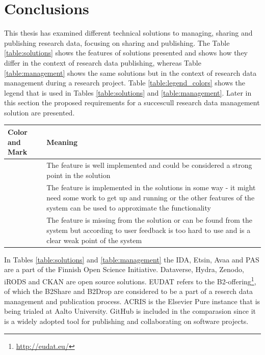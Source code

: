 \chapter{Conclusions}
\label{chapter:conclusions}

This thesis has examined different technical solutions to managing, sharing and
publishing research data, focusing on sharing and publishing. The Table
\ref{table:solutions} shows the features of solutions presented and shows
how they differ in the context of research data publishing, whereas Table
\ref{table:management} shows the same solutions but in the context of research
data management during a research project. Table
\ref{table:legend_colors} shows the legend that is used in Tables
\ref{table:solutions} and \ref{table:management}. Later in this section the
proposed requirements for a succescull research data management solution
are presented.

\label{table:legend_colors}
    \begin{tabularx}{\textwidth}{| >{\raggedright}p{3cm} | X |}
    \hline
    \textbf{Color and Mark} & \textbf{Meaning} \\
    \hline
    \multicolumn{1}{|c|}{\cellcolor{green}++} & The feature is well implemented and could be considered a strong point
                          in the solution \\
    \hline
    \multicolumn{1}{|c|}{\cellcolor{yellow}+} & The feature is implemented in the solutions in some way - it might need
                          some work to get up and running or the other features of the system can be used to
                          approximate the functionality \\
    \hline
    \multicolumn{1}{|c|}{\cellcolor{red}-}    & The feature is missing from the solution or can be found from the system but according
                          to user feedback is too hard to use and is a clear weak point of the system \\
    \hline
\end{tabularx}

In Tables \ref{table:solutions} and \ref{table:management} the IDA, Etsin, Avaa and PAS are a part of the
Finnish Open Science Initiative. Dataverse, Hydra, Zenodo, iRODS and CKAN are
open source solutions. EUDAT refers to the B2-offering\footnote{\url{http://eudat.eu/}},
of which the B2Share and B2Drop are considered to be a part of a reserch
data management and publication process. ACRIS is the Elsevier Pure instance
that is being trialed at Aalto University. GitHub is included in the
comparasion since it is a widely adopted tool for publishing and collaborating
on software projects.

